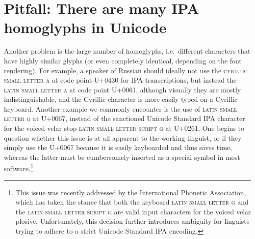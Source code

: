 \section{Pitfall: There are many IPA homoglyphs in Unicode}
\label{pitfall-there-are-many-ipa-homoglyphs-in-unicode}

Another problem is the large number of homoglyphs, i.e.~different characters that have highly similar glyphs (or even completely identical, depending on the font rendering). For example, a speaker of Russian should ideally not use the \textsc{cyrillic small letter a} at code point U+0430 for IPA transcriptions, but instead the \textsc{latin small letter a} at code point U+0061, although visually they are mostly indistinguishable, and the Cyrillic character is more easily typed on a Cyrillic keyboard. Another example we commonly encounter is the use of \textsc{latin small letter g} at U+0067, instead of the sanctioned Unicode Standard IPA character for the voiced velar stop \textsc{latin small letter script g} at U+0261. One begins to question whether this issue is at all apparent to the working linguist, or if they simply use the U+0067 because it is easily keyboarded and thus saves time, whereas the latter must be cumbersomely inserted as a special symbol in most software.\footnote{This issue was recently addressed by the International Phonetic Association, which has taken the stance that both the keyboard \textsc{latin small letter g} and the \textsc{latin small letter script g} are valid input characters for the voiced velar plosive. Unfortunately, this decision further introduces ambiguity for linguists trying to adhere to a strict Unicode Standard IPA encoding.}

